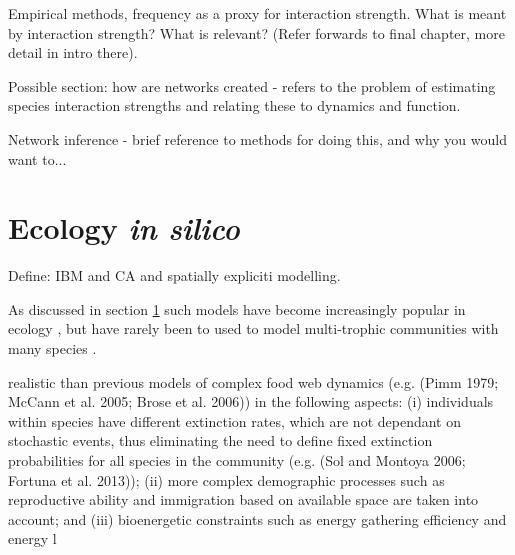 Empirical methods, frequency as a proxy for interaction strength. What is meant by interaction strength? What is relevant? (Refer forwards to final chapter, more detail in intro there). 

Possible section: how are networks created - refers to the problem of estimating species interaction strengths and relating these to dynamics and function.

Network inference - brief reference to methods for doing this, and why you would want to...

\section{Ecology \emph{in silico}}
\label{sec:intro_computers}

Define: IBM and CA and spatially expliciti modelling.

 As discussed in section \ref{sec:intro_computers} such models have become increasingly popular in ecology \cite{judson1994rise}, but have rarely been to used to model multi-trophic communities with many species \cite{lurgi2015effects,grimm2013individual}.

realistic than previous models of complex food web dynamics
(e.g. (Pimm 1979; McCann et al. 2005; Brose et al. 2006)) in the
following aspects: (i) individuals within species have different
extinction rates, which are not dependant on stochastic events,
thus eliminating the need to define fixed extinction probabilities
for all species in the community (e.g. (Sol and Montoya 2006;
Fortuna et al. 2013)); (ii) more complex demographic processes
such as reproductive ability and immigration based on available
space are taken into account; and (iii) bioenergetic constraints
such as energy gathering efficiency and energy l

